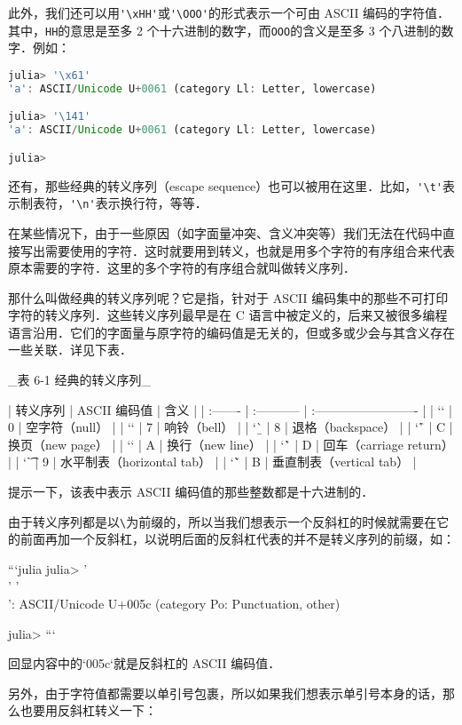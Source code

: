 此外，我们还可以用\verb|'\xHH'|或\verb|'\OOO'|的形式表示一个可由 ASCII 编码的字符值．其中，\verb|HH|的意思是至多 2 个十六进制的数字，而\verb|OOO|的含义是至多 3 个八进制的数字．例如：
\begin{lstlisting}[language=julia]
julia> '\x61'
'a': ASCII/Unicode U+0061 (category Ll: Letter, lowercase)

julia> '\141'
'a': ASCII/Unicode U+0061 (category Ll: Letter, lowercase)

julia> 
\end{lstlisting}

还有，那些经典的转义序列（escape sequence）也可以被用在这里．比如，\verb|'\t'|表示制表符，\verb|'\n'|表示换行符，等等．

在某些情况下，由于一些原因（如字面量冲突、含义冲突等）我们无法在代码中直接写出需要使用的字符．这时就要用到转义，也就是用多个字符的有序组合来代表原本需要的字符．这里的多个字符的有序组合就叫做转义序列．

那什么叫做经典的转义序列呢？它是指，针对于 ASCII 编码集中的那些不可打印字符的转义序列．这些转义序列最早是在 C 语言中被定义的，后来又被很多编程语言沿用．它们的字面量与原字符的编码值是无关的，但或多或少会与其含义存在一些关联．详见下表．

_表 6-1 经典的转义序列_

| 转义序列 | ASCII 编码值 | 含义                       |
| :------- | :----------- | :------------------------- |
| `\0`     | 0            | 空字符（null）             |
| `\a`     | 7            | 响铃（bell）               |
| `\b`     | 8            | 退格（backspace）          |
| `\f`     | C            | 换页（new page）           |
| `\n`     | A            | 换行（new line）           |
| `\r`     | D            | 回车（carriage return）    |
| `\t`     | 9            | 水平制表（horizontal tab） |
| `\v`     | B            | 垂直制表（vertical tab）   |

提示一下，该表中表示 ASCII 编码值的那些整数都是十六进制的．

由于转义序列都是以\verb|\|为前缀的，所以当我们想表示一个反斜杠的时候就需要在它的前面再加一个反斜杠，以说明后面的反斜杠代表的并不是转义序列的前缀，如：

```julia
julia> '\\'
'\\': ASCII/Unicode U+005c (category Po: Punctuation, other)

julia> 
```

回显内容中的`005c`就是反斜杠的 ASCII 编码值．

另外，由于字符值都需要以单引号包裹，所以如果我们想表示单引号本身的话，那么也要用反斜杠转义一下：

